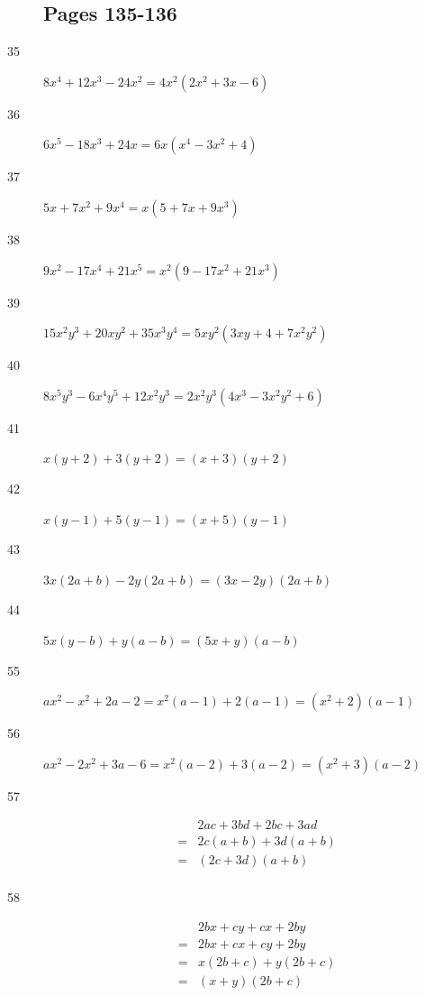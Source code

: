 \documentclass[fleqn,addpoints]{exam}
\begin{document}
\begin{description}

\subsection{Pages 135-136}

\item[35]
\( 8x^4 + 12x^3 - 24x^2 = 4x^2(2x^2 + 3x - 6) \)

\item[36]
\( 6x^5 - 18x^3 + 24x = 6x(x^4 - 3x^2 + 4) \)

\item[37]
\( 5x + 7x^2 + 9x^4 = x(5 + 7x + 9x^3) \)

\item[38]
\( 9x^2 - 17x^4 + 21x^5 = x^2(9 - 17x^2 + 21x^3) \)

\item[39]
\( 15x^2y^3 + 20xy^2 + 35x^3y^4 = 5xy^2(3xy + 4 + 7x^2y^2) \)

\item[40]
\( 8x^5y^3 - 6x^4y^5 + 12x^2y^3 = 2x^2y^3(4x^3 - 3x^2y^2 + 6) \)

\item[41]
\( x(y + 2) + 3(y + 2) = (x + 3)(y + 2) \)

\item[42]
\( x(y - 1) + 5(y - 1) = (x + 5)(y - 1) \)

\item[43]
\( 3x(2a + b) - 2y(2a + b) = (3x - 2y)(2a + b) \)

\item[44]
\( 5x(y - b) + y(a - b) = (5x + y)(a - b) \)

\item[55]
\( ax^2 - x^2 + 2a - 2 = x^2(a - 1) + 2(a - 1) = (x^2 + 2)(a - 1) \)

\item[56]
\( ax^2 - 2x^2 + 3a - 6 = x^2(a - 2) + 3(a - 2) = (x^2 + 3)(a - 2) \)

\item[57]
\begin{eqnarray*}
   && 2ac + 3bd + 2bc + 3ad \\
  &=& 2c(a + b) + 3d(a + b) \\
  &=& (2c + 3d)(a + b) \\
\end{eqnarray*}

\item[58]
\begin{eqnarray*}
  && 2bx + cy + cx + 2by \\
  &=& 2bx + cx + cy + 2by \\
  &=& x(2b + c) + y(2b + c) \\
  &=& (x + y)(2b + c) \\
\end{eqnarray*}


\end{description}
\end{document}
